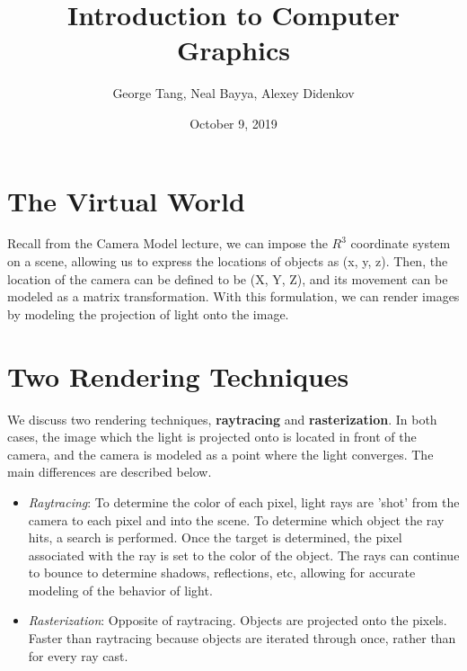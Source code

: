 \documentclass{article}
\title{Introduction to Computer Graphics}
\author{George Tang, Neal Bayya, Alexey Didenkov}
\date{October 9, 2019}
\begin{document}
\maketitle

\section{The Virtual World}
Recall from the Camera Model lecture, we can impose the $R^3$ coordinate system on a scene, allowing us to express the locations of objects as (x, y, z). Then, the location of the camera can be defined to be (X, Y, Z), and its movement can be modeled as a matrix transformation. With this formulation, we can render images by modeling the projection of light onto the image. 

\section{Two Rendering Techniques}
We discuss two rendering techniques, \textbf{raytracing} and \textbf{rasterization}. In both cases, the image which the light is projected onto is located in front of the camera, and the camera is modeled as a point where the light converges. The main differences are described below.

\begin{itemize}
    \item \textit{Raytracing}: To determine the color of each pixel, light rays are 'shot' from the camera to each pixel and into the scene. To determine which object the ray hits, a search is performed. Once the target is determined, the pixel associated with the ray is set to the color of the object. The rays can continue to bounce to determine shadows, reflections, etc, allowing for accurate modeling of the behavior of light.
    \item \textit{Rasterization}:  Opposite of raytracing. Objects are projected onto the pixels. Faster than raytracing because objects are iterated through once, rather than for every ray cast.
\end{itemize}
\end{document}
